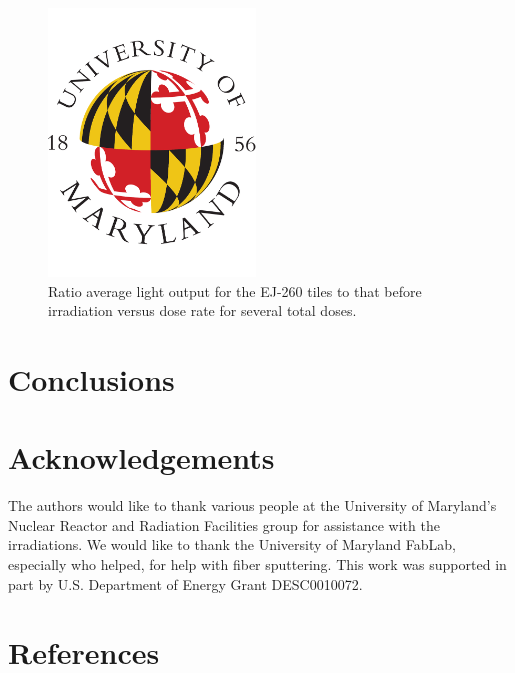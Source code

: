 \documentclass[review]{elsarticle}
\begin{document}
\begin{figure}[!ht]
\begin{center}
\includegraphics[width=0.49\textwidth]{./figures/placeholder.pdf}
\caption{
Ratio average light output for the EJ-260 tiles to that before irradiation versus dose rate for several total doses.
}
\label{fig:fig3}
\end{center}
\end{figure}





\section{Conclusions}

\section{Acknowledgements}
The authors would like to thank {\color{red} various people} at
the University of Maryland's Nuclear Reactor and Radiation
Facilities group for assistance
with the irradiations.  We would like to thank the University of Maryland
FabLab, especially {\color{red} who helped}, for help with fiber sputtering.
This work was supported in part by U.S. Department of Energy Grant DESC0010072.

\section*{References}


\end{document}
